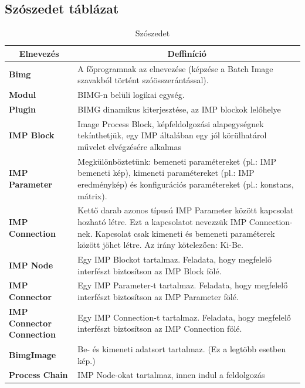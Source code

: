 \documentclass[a4paper,12pt,oneside]{report}
\begin{document}
\begin{table}[h]
\subsection{Szószedet táblázat}
\begin{tabular}{p{3cm}|p{10cm}}

\toprule
\multicolumn{1}{c}{\textbf{Elnevezés}} & \multicolumn{1}{c}{\textbf{Deffiníció}} \\ \midrule
\textbf{Bimg} & A főprogramnak az elnevezése (képzése a Batch Image szavakból történt szóösszerántással). \\
\hline
\textbf{Modul} & BIMG-n belüli logikai egység. \\
\hline
\textbf{Plugin} & BIMG dinamikus kiterjesztése, az IMP blockok lelőhelye \\
\hline
\textbf{IMP Block} & Image Process Block, képfeldolgozási alapegységnek tekínthetjük, egy IMP általában egy jól körülhatárol művelet elvégzésére alkalmas \\
\hline
\textbf{IMP Parameter} & Megkülönböztetünk: bemeneti paramétereket (pl.: IMP bemeneti kép), kimeneti paramétereket (pl.: IMP eredménykép) és konfigurációs paramétereket (pl.: konstans, mátrix). \\
\hline
\textbf{IMP Connection} & Kettő darab azonos típusú IMP Parameter között kapcsolat hozható létre. Ezt a kapcsolatot nevezzük IMP Connection-nek. Kapcsolat csak kimeneti és bemeneti paraméterek között jöhet létre. Az irány kötelezően: Ki-Be. \\
\hline
\textbf{IMP Node} & Egy IMP Blockot tartalmaz. Feladata, hogy megfelelő interfészt biztosítson az IMP Block fölé. \\
\hline
\textbf{IMP Connector} & Egy IMP Parameter-t tartalmaz. Feladata, hogy megfelelő interfészt biztosítson az IMP Parameter fölé. \\
\hline
\textbf{IMP Connector Connection} & Egy IMP Connection-t tartalmaz. Feladata, hogy megfelelő interfészt biztosítson az IMP Connection fölé. \\
\hline
\textbf{BimgImage} & Be- és kimeneti adatsort tartalmaz. (Ez a legtöbb esetben kép.) \\
\hline
\textbf{Process Chain} & IMP Node-okat tartalmaz, innen indul a feldolgozás \\

\hline
\end{tabular}
\caption{Szószedet}
\label{table:szoszedet}
\end{table}
\end{document}
